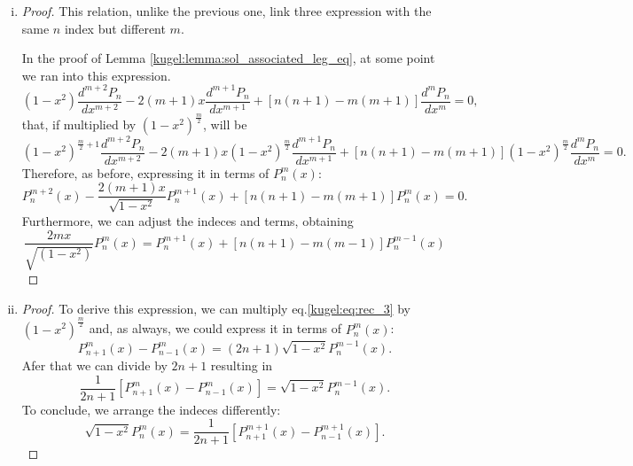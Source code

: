 \begin{enumerate}[(i)]
  \item
  \begin{proof}
    This relation, unlike the previous one, link three expression with the same $n$ index but different $m$. 
    
    In the proof of Lemma \ref{kugel:lemma:sol_associated_leg_eq}, at some point we ran into this expression.
    \begin{equation*}
      (1-x^2)\frac{d^{m+2}P_n}{dx^{m+2}} - 2(m+1)x \frac{d^{m+1}P_n}{dx^{m+1}} + [n(n+1)-m(m+1)]\frac{d^mP_n}{dx^m} = 0,
    \end{equation*}
    that, if multiplied by $(1-x^2)^{\frac{m}{2}}$, will be
    \begin{equation*}
      (1-x^2)^{\frac{m}{2}+1}\frac{d^{m+2}P_n}{dx^{m+2}} - 2(m+1)x (1-x^2)^{\frac{m}{2}}\frac{d^{m+1}P_n}{dx^{m+1}} + [n(n+1)-m(m+1)](1-x^2)^{\frac{m}{2}}\frac{d^mP_n}{dx^m} = 0.
    \end{equation*}
    Therefore, as before, expressing it in terms of $P^m_n(x)$:
    \begin{equation*}
      P^{m+2}_n(x) - \frac{2(m+1)x}{\sqrt{1-x^2}}P^{m+1}_n(x) + [n(n+1)-m(m+1)]P^m_n(x)=0.
    \end{equation*}
    Furthermore, we can adjust the indeces and terms, obtaining
    \begin{equation*}
      \frac{2mx}{\sqrt{(1-x^2)}} P^m_n(x) = P^{m+1}_n(x) + [n(n+1)-m(m-1)] P^{m-1}_n(x)
    \end{equation*}
  
  \end{proof}
  
  \item
  \begin{proof}
    To derive this expression, we can multiply eq.\eqref{kugel:eq:rec_3} by $(1-x^2)^{\frac{m}{2}}$ and, as always, we could express it in terms of $P^m_n(x)$:
    \begin{equation*}
      P^m_{n+1}(x) - P^m_{n-1}(x) = (2n+1)\sqrt{1-x^2}P^{m-1}_n(x).
    \end{equation*}
    Afer that we can divide by $2n+1$ resulting in
    \begin{equation}\label{kugel:eq:helper}
      \frac{1}{2n+1}[P^m_{n+1}(x) - P^m_{n-1}(x)] = \sqrt{1-x^2}P^{m-1}_n(x).
    \end{equation}
    To conclude, we arrange the indeces differently:
    \begin{equation*}
      \sqrt{1-x^2}P^{m}_n(x)=\frac{1}{2n+1}[P^{m+1}_{n+1}(x) - P^{m+1}_{n-1}(x)].
    \end{equation*}
  \end{proof}


\end{enumerate}
